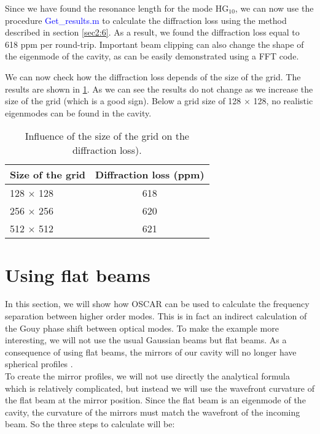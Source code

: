 Since we have found the resonance length for the mode HG$_{10}$, we can now use the procedure \textcolor{blue}{Get\_results.m} to calculate the diffraction loss using the method described in section \ref{sec2:6}. As a result, we found the diffraction loss equal to 618 ppm per round-trip. Important beam clipping can also change the shape of the eigenmode of the cavity, as can be easily demonstrated using a FFT code\cite{Pab}.

We can now check how the diffraction loss depends of the size of the grid. The results are shown in \ref{tab3:grid_size}. As we can see the results do not change as we increase the size of the grid (which is a good sign). Below a grid size of 128 $\times$ 128, no realistic eigenmodes can be found in the cavity.

\begin{table}[tbp]
  \centering
  \caption{\label{tab3:grid_size} Influence of the size of the grid on the diffraction loss).}
\begin{tabular}{|l|c|}
\hline
{\large\strut} Size of the grid  & Diffraction loss (ppm) \\
\hline
{\large\strut} 128 $\times$ 128 &  618 \\
{\large\strut} 256 $\times$ 256 &  620 \\
{\large\strut} 512 $\times$ 512 &  621 \\
\hline
\end{tabular}
\end{table}



\section{Using flat beams}
\label{cha3.3}

In this section, we will show how OSCAR can be used to calculate the frequency separation between higher order modes. This is in fact an indirect calculation of the Gouy phase shift between optical modes. To make the example more interesting, we will not use the usual Gaussian beams but flat beams. As a consequence of using flat beams, the mirrors of our cavity will no longer have spherical profiles \cite{Flat}.\\

To create the mirror profiles, we will not use directly the analytical formula which is relatively complicated, but instead we will use the wavefront curvature of the flat beam at the mirror position. Since the flat beam is an eigenmode of the cavity, the curvature of the mirrors must match the wavefront of the incoming beam. So the three steps to calculate will be:


